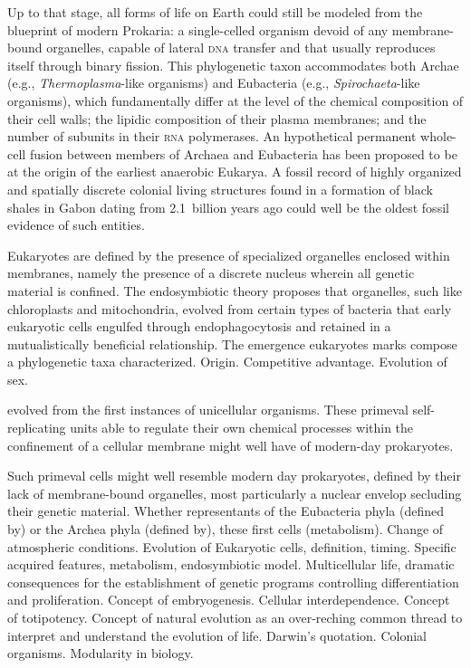 \documentclass{tufte-book}
\begin{document}

Up to that stage, all forms of life on Earth could still be modeled from the
blueprint of modern Prokaria: a \mbox{single-celled} organism devoid of any
\mbox{membrane-bound} organelles, capable of lateral \textsc{dna} transfer and
that usually reproduces itself through binary fission.  This phylogenetic taxon
accommodates both Archae (e.g., \mbox{\emph{Thermoplasma}-like} organisms) and
Eubacteria (e.g., \mbox{\emph{Spirochaeta}-like} organisms), which fundamentally
differ at the level of the chemical composition of their cell walls; the lipidic
composition of their plasma membranes; and the number of subunits in their
\textsc{rna} polymerases.  An hypothetical permanent \mbox{whole-cell} fusion
between members of Archaea and Eubacteria has been proposed to be at the origin
of the earliest anaerobic Eukarya.\cite{margulis_archaeal-eubacterial_1996} A
fossil record of highly organized and spatially discrete colonial living
structures found in a formation of black shales in Gabon dating from 2.1~billion
years ago could well be the oldest fossil evidence of such
entities.\cite{albani_large_2010}

Eukaryotes are defined by the presence of specialized organelles enclosed
within membranes, namely the presence of a discrete nucleus wherein all genetic
material is confined.  The endosymbiotic theory proposes that organelles, such
like chloroplasts and mitochondria, evolved from certain types of bacteria that
early eukaryotic cells engulfed through endophagocytosis and retained in a
mutualistically beneficial relationship.  The emergence eukaryotes marks compose
a phylogenetic taxa characterized.  Origin.  Competitive advantage.  Evolution
of sex.


evolved from the
first instances of unicellular organisms. These primeval \mbox{self-replicating}
units able to regulate their own chemical processes within the confinement of a
cellular membrane might well have of \mbox{modern-day} prokaryotes.

Such primeval cells might well resemble modern day
prokaryotes, defined by their lack of membrane-bound organelles, most
particularly a nuclear envelop secluding their genetic material.  Whether
representants of the Eubacteria phyla (defined by) or the Archea phyla (defined
by), these first cells (metabolism).  Change of atmospheric conditions.
Evolution of Eukaryotic cells, definition, timing.  Specific acquired features,
metabolism, endosymbiotic model.  Multicellular life, dramatic consequences for
the establishment of genetic programs controlling differentiation and
proliferation.  Concept of embryogenesis.  Cellular interdependence. Concept of
totipotency.  Concept of natural evolution as an over-reching common thread to
interpret and understand the evolution of life.  Darwin's quotation.  Colonial
organisms.  Modularity in biology.
\end{document}
